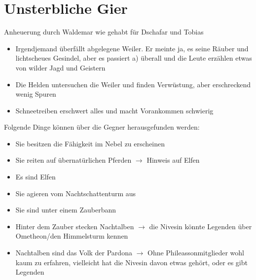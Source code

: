 \section{Unsterbliche Gier}

Anheuerung durch Waldemar wie gehabt für Dschafar und Tobias
\begin{itemize}
	\item  Irgendjemand überfällt abgelegene Weiler. Er meinte ja, es seine Räuber und lichtscheues Gesindel, aber es passiert a) überall und die Leute erzählen etwas von wilder Jagd und Geistern
	\item  Die Helden untersuchen die Weiler und finden Verwüstung, aber erschreckend wenig Spuren
	\item  Schneetreiben erschwert alles und macht Vorankommen schwierig
\end{itemize}

Folgende Dinge können über die Gegner herausgefunden werden:
\begin{itemize}

	\item  Sie besitzen die Fähigkeit im Nebel zu erscheinen
	\item  Sie reiten auf übernatürlichen Pferden $\to$ Hinweis auf Elfen
	\item  Es sind Elfen
	\item  Sie agieren vom Nachtschattenturm aus
	\item  Sie sind unter einem Zauberbann
	\item  Hinter dem Zauber stecken Nachtalben $\to$ die Nivesin könnte Legenden über Ometheon/den Himmelsturm kennen
	\item  Nachtalben sind das Volk der Pardona $\to$ Ohne Phileassonmitglieder wohl kaum zu erfahren, vielleicht hat die Nivesin davon etwas gehört, oder es gibt Legenden
\end{itemize}

